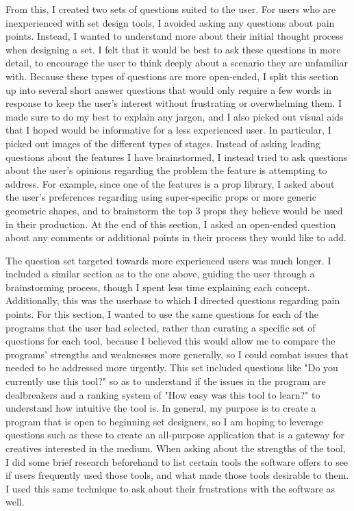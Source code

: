 \documentclass[10pt,twocolumn]{article}
\begin{document}
From this, I created two sets of questions suited to the user. For users who are inexperienced with set design tools, I avoided asking any questions about pain points. Instead, I wanted to understand more about their initial thought process when designing a set. I felt that it would be best to ask these questions in more detail, to encourage the user to think deeply about a scenario they are unfamiliar with. Because these types of questions are more open-ended, I split this section up into several short answer questions that would only require a few words in response to keep the user's interest without frustrating or overwhelming them. I made sure to do my best to explain any jargon, and I also picked out visual aids that I hoped would be informative for a less experienced user. In particular, I picked out images of the different types of stages. Instead of asking leading questions about the features I have brainstormed, I instead tried to ask questions about the user's opinions regarding the problem the feature is attempting to address. For example, since one of the features is a prop library, I asked about the user's preferences regarding using super-specific props or more generic geometric shapes, and to brainstorm the top 3 props they believe would be used in their production. At the end of this section, I asked an open-ended question about any comments or additional points in their process they would like to add.

The question set targeted towards more experienced users was much longer. I included a similar section as to the one above, guiding the user through a brainstorming process, though I spent less time explaining each concept. Additionally, this was the userbase to which I directed questions regarding pain points. For this section, I wanted to use the same questions for each of the programs that the user had selected, rather than curating a specific set of questions for each tool, because I believed this would allow me to compare the programs' strengths and weaknesses more generally, so I could combat issues that needed to be addressed more urgently. This set included questions like "Do you currently use this tool?" so as to understand if the issues in the program are dealbreakers and a ranking system of "How easy was this tool to learn?" to understand how intuitive the tool is. In general, my purpose is to create a program that is open to beginning set designers, so I am hoping to leverage questions such as these to create an all-purpose application that is a gateway for creatives interested in the medium. When asking about the strengths of the tool, I did some brief research beforehand to list certain tools the software offers to see if users frequently used those tools, and what made those tools desirable to them. I used this same technique to ask about their frustrations with the software as well.
\end{document}
